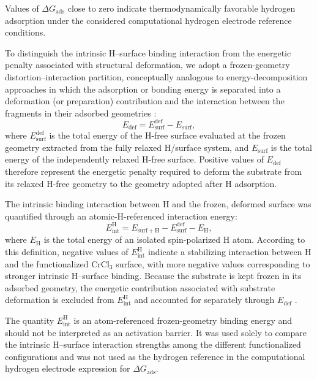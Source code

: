 \documentclass[journal=jacsat,manuscript=article]{achemso}
\begin{document}
Values of $\Delta G_{\mathrm{ads}}$ close to zero indicate thermodynamically favorable hydrogen adsorption under the considered computational hydrogen electrode reference conditions.

To distinguish the intrinsic H--surface binding interaction from the
energetic penalty associated with structural deformation, we adopt a
frozen-geometry distortion--interaction partition, conceptually
analogous to energy-decomposition approaches in which the adsorption
or bonding energy is separated into a deformation (or preparation)
contribution and the interaction between the fragments in their
adsorbed geometries \cite{Raupach2015,Staub2019,Clabaut2020}:
\begin{equation}
  E_{\mathrm{def}}=E_{\mathrm{surf}}^{\mathrm{def}}-E_{\mathrm{surf}},
  \label{eq:Edef}
\end{equation}
where $E_{\mathrm{surf}}^{\mathrm{def}}$ is the total energy of the H-free surface evaluated at the frozen geometry extracted from the fully relaxed H/surface system, and $E_{\mathrm{surf}}$ is the total energy of the independently relaxed H-free surface. Positive values of $E_{\mathrm{def}}$ therefore represent the energetic penalty required to deform the substrate from its relaxed H-free geometry to the geometry adopted after H adsorption.

The intrinsic binding interaction between H and the frozen, deformed surface was quantified through an atomic-H-referenced interaction energy:
\begin{equation}
  E_{\mathrm{int}}^{\mathrm{H}}
  =
  E_{\mathrm{surf+H}}
  -
  E_{\mathrm{surf}}^{\mathrm{def}}
  -
  E_{\mathrm{H}},
  \label{eq:Eint}
\end{equation}
where $E_{\mathrm{H}}$ is the total energy of an isolated spin-polarized H atom. According to this definition, negative values of $E_{\mathrm{int}}^{\mathrm{H}}$ indicate a stabilizing interaction between H and the functionalized CrCl$_3$ surface, with more negative values corresponding to stronger intrinsic H--surface binding. Because the substrate is kept frozen in its adsorbed geometry, the energetic contribution associated with substrate deformation is excluded from $E_{\mathrm{int}}^{\mathrm{H}}$ and accounted for separately through $E_{\mathrm{def}}$ \cite{Staub2019,Clabaut2020}.

The quantity $E_{\mathrm{int}}^{\mathrm{H}}$ is an atom-referenced frozen-geometry binding energy and should not be interpreted as an activation barrier. It was used solely to compare the intrinsic H--surface interaction strengths among the different functionalized configurations and was not used as the hydrogen reference in the computational hydrogen electrode expression for $\Delta G_{\mathrm{ads}}$.
\end{document}
